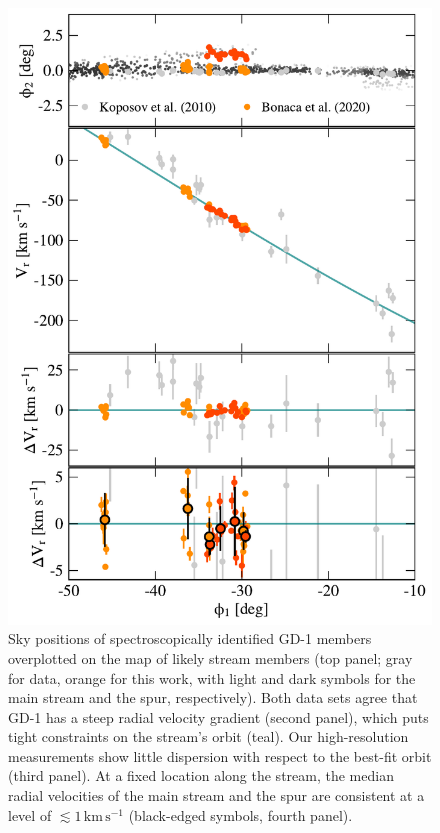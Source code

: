 \documentclass[twocolumn]{aastex63}
\newcommand{\kms}{\ensuremath{\textrm{km}\,\textrm{s}^{-1}}}
\begin{document}
\begin{figure}
\begin{center}
\includegraphics[width=0.99\columnwidth]{gd1_kinematics.pdf}
\end{center}
\caption{Sky positions of spectroscopically identified GD-1 members overplotted on the map of likely stream members (top panel; gray for \citet{koposov2010} data, orange for this work, with light and dark symbols for the main stream and the spur, respectively).
Both data sets agree that GD-1 has a steep radial velocity gradient (second panel), which puts tight constraints on the stream's orbit (teal).
Our high-resolution measurements show little dispersion with respect to the best-fit orbit (third panel).
At a fixed location along the stream, the median radial velocities of the main stream and the spur are consistent at a level of $\lesssim1\,\kms$ (black-edged symbols, fourth panel).
}
\label{fig:vr}
\end{figure}
\end{document}

